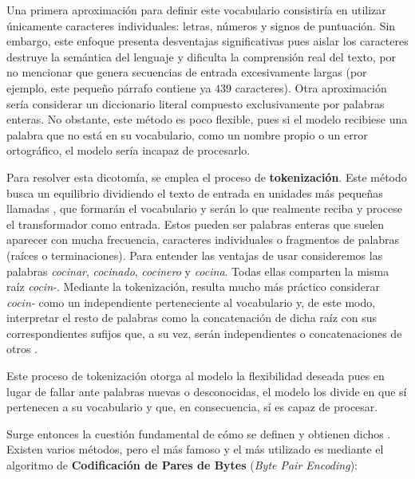 Una primera aproximación para definir este vocabulario consistiría en utilizar 
únicamente caracteres individuales: letras, números y signos de puntuación. 
Sin embargo, este enfoque presenta desventajas significativas pues aislar los 
caracteres destruye la semántica del lenguaje y dificulta la comprensión real del 
texto, por no mencionar que genera secuencias de entrada excesivamente largas 
(por ejemplo, este pequeño párrafo contiene ya $439$ caracteres). Otra aproximación 
sería considerar un diccionario literal compuesto exclusivamente por palabras enteras. 
No obstante, este método es poco flexible, pues si el modelo recibiese una palabra 
que no está en su vocabulario, como un nombre propio o un error ortográfico, el 
modelo sería incapaz de procesarlo.

Para resolver esta dicotomía, se emplea el proceso de \textbf{tokenización}. 
Este método busca un equilibrio dividiendo el texto de entrada en unidades más pequeñas
llamadas \tokens{}, que formarán el vocabulario y serán lo que realmente reciba y 
procese el transformador como entrada. Estos \tokens{} pueden ser palabras enteras que 
suelen aparecer con mucha frecuencia, caracteres individuales o fragmentos de 
palabras (raíces o terminaciones).
Para  entender las ventajas de usar \tokens{} consideremos las palabras 
\textit{cocinar}, \textit{cocinado}, \textit{cocinero} y \textit{cocina}. 
Todas ellas comparten la misma raíz \textit{cocin-}. Mediante la tokenización, 
resulta mucho más práctico considerar \textit{cocin-} como un \token{} independiente 
perteneciente al vocabulario y, de este modo, interpretar el resto de palabras como 
la concatenación de dicha raíz con sus correspondientes sufijos que, a su vez, 
serán \tokens{} independientes o concatenaciones de otros \tokens{}.

Este proceso de tokenización otorga al modelo la flexibilidad deseada pues en 
lugar de fallar ante palabras nuevas o desconocidas, el modelo los divide en \tokens{} 
que sí pertenecen a su vocabulario y que, en consecuencia, sí es capaz de procesar. 

Surge entonces la cuestión fundamental de cómo se definen y obtienen dichos \tokens{}. 
Existen varios métodos, pero el más famoso y el más utilizado es mediante el algoritmo 
de \textbf{Codificación de Pares de Bytes} (\textit{Byte Pair Encoding}): 

